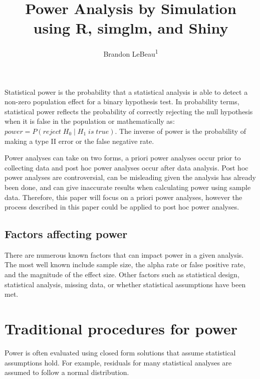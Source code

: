 \documentclass[man]{apa6}
\title{Power Analysis by Simulation using R, simglm, and Shiny}
\author{Brandon LeBeau\textsuperscript{1}}
\date{}
\affiliation{
\vspace{0.5cm}
\textsuperscript{1} University of Iowa}
\begin{document}
\maketitle

Statistical power is the probability that a statistical analysis is able to detect a non-zero population effect for a binary hypothesis test. In probability terms, statistical power reflects the probability of correctly rejecting the null hypothesis when it is false in the population or mathematically as: \(power = P(reject \; H_{0} \; | \; H_{1} \; is \; true)\). The inverse of power is the probability of making a type II error or the false negative rate.

Power analyses can take on two forms, a priori power analyses occur prior to collecting data and post hoc power analyses occur after data analysis. Post hoc power analyses are controversial, can be misleading given the analysis has already been done, and can give inaccurate results when calculating power using sample data. Therefore, this paper will focus on a priori power analyses, however the process described in this paper could be applied to post hoc power analyses.

\hypertarget{factors-affecting-power}{%
\subsection{Factors affecting power}\label{factors-affecting-power}}

There are numerous known factors that can impact power in a given analysis. The most well known include sample size, the alpha rate or false positive rate, and the magnitude of the effect size. Other factors such as statistical design, statistical analysis, missing data, or whether statistical assumptions have been met.

\hypertarget{traditional-procedures-for-power}{%
\section{Traditional procedures for power}\label{traditional-procedures-for-power}}

Power is often evaluated using closed form solutions that assume statistical assumptions hold. For example, residuals for many statistical analyses are assumed to follow a normal distribution.
\end{document}
